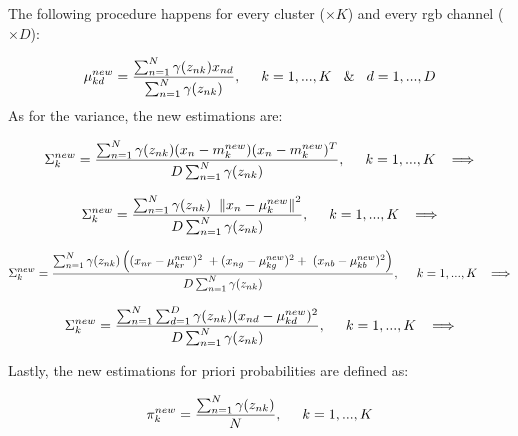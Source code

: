 \documentclass[11pt]{article}
\begin{document}
\noindent The following procedure happens for every cluster ($\times K$) and every rgb channel ($ \times D$):

$$
\mu_{kd}^{new} = \frac{\sum_{n=1}^{N} \gamma{(z_{nk})} x_{nd}}{\sum_{n=1}^{N} \gamma{(z_{nk})}},  \hspace{5mm} k=1,...,K \hspace{3mm} \& \hspace{3mm} d=1,...,D$$
\newline
\noindent As for the variance, the new estimations are:

$$ 
\Sigma_k^{new} = \frac{\sum_{n=1}^{N}\gamma{(z_{nk})} (x_{n} - m_{k}^{new})(x_{n} - m_{k}^{new})^T}{D\sum_{n=1}^{N} \gamma{(z_{nk})}},  \hspace{5mm} k=1,...,K \hspace{3mm} \Longrightarrow 
$$


$$
\Sigma_k^{new} = \frac{\sum_{n=1}^{N}\gamma{(z_{nk})} \hspace{2mm} {\lVert{ x_{n} - \mu_{k}^{new} }\rVert}^2 }{D\sum_{n=1}^{N} \gamma{(z_{nk})}} ,  \hspace{5mm} k=1,...,K \hspace{3mm} \Longrightarrow 
$$


$$
\Sigma_k^{new} = \frac{\sum_{n=1}^{N}\gamma{(z_{nk})} \left(( x_{nr} - \mu_{kr}^{new} )^2 \hspace{1mm} + (x_{ng} - \mu_{kg}^{new})^2 +\hspace{1mm} (x_{nb} - \mu_{kb}^{new})^2 \right)}
{D\sum_{n=1}^{N} \gamma{(z_{nk})}},  \hspace{5mm} k=1,...,K \hspace{3mm} \Longrightarrow 
$$


$$
\Sigma_k^{new} = \frac{\sum_{n=1}^{N} \sum_{d=1}^{D}  \gamma{(z_{nk})} ( x_{nd} - \mu_{kd}^{new} )^2}
{D\sum_{n=1}^{N} \gamma{(z_{nk})}},  \hspace{5mm} k=1,...,K \hspace{3mm}\Longrightarrow 
$$
\newline

\noindent Lastly, the new estimations for priori probabilities are defined as:


$$
\pi_k^{new} = \frac{\sum_{n=1}^{N} \gamma{(z_{nk})}}{N},  \hspace{5mm} k=1,...,K  $$
\end{document}
